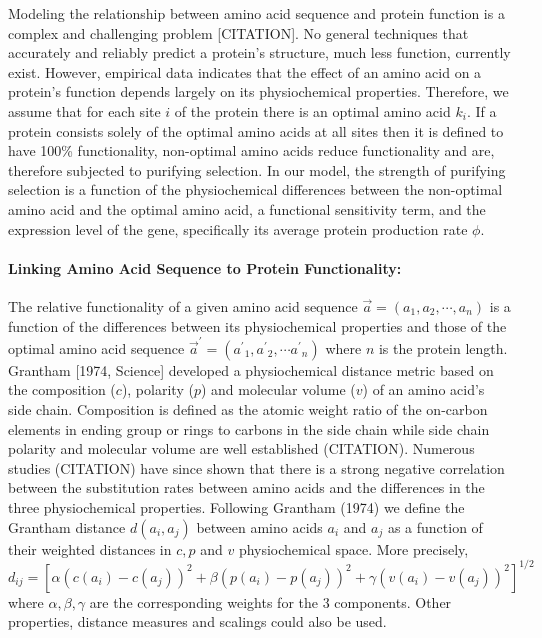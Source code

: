 \documentclass[13pt]{article}
\newcommand{\avecopt}{\ensuremath{\vec{a}^\prime}\xspace}
\newcommand{\aopt}{\ensuremath{a^\prime}\xspace}
\begin{document}
Modeling the relationship between amino acid sequence and protein function is a complex and challenging problem [CITATION].
No general techniques that accurately and reliably predict a protein's structure, much less function, currently exist.
However, empirical data indicates that the effect of an amino acid on a protein's function depends largely on its physiochemical properties.
Therefore, we assume that for each site $i$ of the protein there is an optimal amino acid $k_i$.
If a protein consists solely of the optimal amino acids at all sites then it is defined to have 100\% functionality, non-optimal amino acids reduce functionality and are, therefore subjected to purifying selection.
In our model, the strength of purifying selection is a function of the physiochemical differences between the non-optimal amino acid and the optimal amino acid, a functional sensitivity term, and the expression level of the gene, specifically its average protein production rate $\phi$.


\paragraph*{Linking Amino Acid Sequence to  Protein Functionality:}
The relative functionality of a given amino acid sequence $\vec{a} = (a_1, a_2, \cdots, a_n)$  is a function of the differences between its physiochemical properties and those of the optimal amino acid sequence $\avecopt = (\aopt_1, \aopt_2, \cdots \aopt_n)$ where $n$ is the protein length. 
Grantham [1974, Science] developed a physiochemical distance metric based on the composition ($c$), polarity ($p$) and molecular volume ($v$) of an amino acid's side chain. 
Composition is defined as the atomic weight ratio of the on-carbon elements in ending group or rings to carbons in the side chain while side chain polarity and molecular volume are well established (CITATION). 
Numerous studies (CITATION) have since shown that there is a strong negative correlation between the substitution rates between amino acids and the differences in the three physiochemical properties. 
Following Grantham (1974) we define the Grantham distance $d(a_i, a_j)$ between amino acids $a_i$ and $a_j$ as a function of their weighted distances in $c, p$ and $v$ physiochemical space.
More precisely, $d_{ij} = [\alpha (c(a_i)-c(a_j))^2 + \beta (p(a_i) - p(a_j))^2 + \gamma (v(a_i) - v(a_j))^2]^{1/2}$ where $\alpha, \beta, \gamma$ are the corresponding weights for the 3 components. 
Other properties, distance measures and scalings could also be used.
\end{document}
